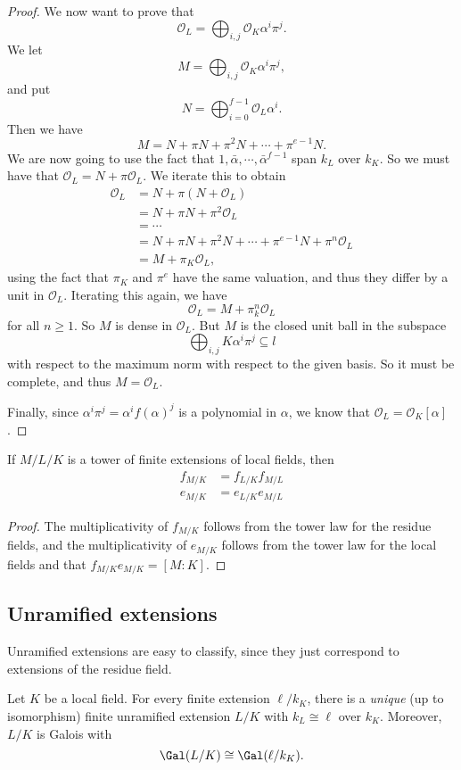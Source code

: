 \documentclass[a4paper]{article}
\begin{document}
\begin{proof}
  We now want to prove that
  \[
    \mathcal{O}_L = \bigoplus_{i, j} \mathcal{O}_K \alpha^i \pi^j.
  \]
  We let
  \[
    M = \bigoplus_{i, j} \mathcal{O}_K \alpha^i \pi^j,
  \]
  and put
  \[
    N = \bigoplus_{i = 0}^{f - 1} \mathcal{O}_L \alpha^i.
  \]
  Then we have
  \[
    M = N + \pi N + \pi^2 N + \cdots + \pi^{e - 1}N.
  \]
  We are now going to use the fact that $1, \bar{\alpha}, \cdots, \bar{\alpha}^{f - 1}$ span $k_L$ over $k_K$. So we must have that $\mathcal{O}_L = N + \pi \mathcal{O}_L$. We iterate this to obtain
  \begin{align*}
    \mathcal{O}_L &= N + \pi(N + \mathcal{O}_L) \\
    &= N + \pi N + \pi^2 \mathcal{O}_L \\
    &= \cdots \\
    &= N + \pi N + \pi^2 N + \cdots + \pi^{e - 1}N + \pi^n \mathcal{O}_L\\
    &= M + \pi_K \mathcal{O}_L,
  \end{align*}
  using the fact that $\pi_K$ and $\pi^e$ have the same valuation, and thus they differ by a unit in $\mathcal{O}_L$. Iterating this again, we have
  \[
    \mathcal{O}_L = M + \pi_k^n \mathcal{O}_L
  \]
  for all $n \geq 1$. So $M$ is dense in $\mathcal{O}_L$. But $M$ is the closed unit ball in the subspace
  \[
    \bigoplus_{i, j}K \alpha^i \pi^j \subseteq l
  \]
  with respect to the maximum norm with respect to the given basis. So it must be complete, and thus $M = \mathcal{O}_L$.

  Finally, since $\alpha^i \pi^j = \alpha^i f(\alpha)^j$ is a polynomial in $\alpha$, we know that $\mathcal{O}_L = \mathcal{O}_K[\alpha]$.
\end{proof}

\begin{cor}
  If $M/L/K$ is a tower of finite extensions of local fields, then
  \begin{align*}
    f_{M/K} &= f_{L/K}f_{M/L}\\
    e_{M/K} &= e_{L/K}e_{M/L}
  \end{align*}
\end{cor}

\begin{proof}
  The multiplicativity of $f_{M/K}$ follows from the tower law for the residue fields, and the multiplicativity of $e_{M/K}$ follows from the tower law for the local fields and that $f_{M/K}e_{M/K} = [M:K]$.
\end{proof}
\subsection{Unramified extensions}
Unramified extensions are easy to classify, since they just correspond to extensions of the residue field.
\begin{thm}
  Let $K$ be a local field. For every finite extension $\ell /k_K$, there is a \emph{unique} (up to isomorphism) finite unramified extension $L/K$ with $k_L \cong \ell$ over $k_K$. Moreover, $L/K$ is Galois with
  \[
    \Gal(L/K) \cong \Gal(\ell/k_K).
  \]
\end{thm}
\end{document}
